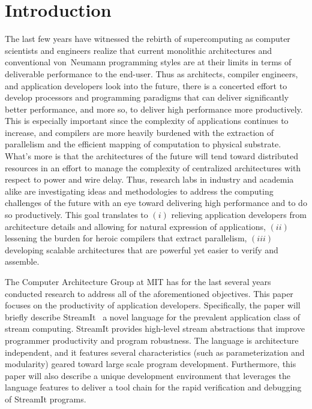 \documentclass[times, 10pt,twocolumn]{article}
\begin{document}
\section{Introduction}

The last  few years  have witnessed the  rebirth of  supercomputing as
computer  scientists  and engineers  realize  that current  monolithic
architectures and  conventional von~Neumann programming  styles are at
their  limits in  terms of  deliverable performance  to  the end-user.
Thus  as architects,  compiler engineers,  and  application developers
look  into  the  future,  there  is  a  concerted  effort  to  develop
processors  and programming paradigms  that can  deliver significantly
better  performance, and  more so,  to deliver  high  performance more
productively.  This  is especially  important since the  complexity of
applications  continues to  increase, and  compilers are  more heavily
burdened with the extraction  of parallelism and the efficient mapping
of  computation  to  physical  substrate.   What's more  is  that  the
architectures of the future  will tend toward distributed resources in
an effort  to manage the complexity of  centralized architectures with
respect to power  and wire delay. Thus, research  labs in industry and
academia alike  are investigating  ideas and methodologies  to address
the computing challenges  of the future with an  eye toward delivering
high performance  and to do  so productively. This goal  translates to
$(i)$ relieving application  developers from architecture details and
allowing for natural expression  of applications, $(ii)$ lessening the
burden  for   heroic  compilers  that   extract  parallelism,  $(iii)$
developing  scalable architectures  that  are powerful  yet easier  to
verify and assemble.

The Computer Architecture Group at  MIT has for the last several years
conducted  research to  address all  of the  aforementioned objectives.
This   paper    focuses   on   the    productivity   of   application
developers.   Specifically,   the    paper   will   briefly   describe
StreamIt~\cite{streamitcc}  a   novel  language  for   the  prevalent
application  class of stream  computing. StreamIt  provides high-level
stream abstractions  that improve programmer  productivity and program
robustness.  The language is architecture independent, and it features
several  characteristics  (such  as parameterization  and  modularity)
geared  toward  large scale  program  development.  Furthermore,  this
paper  will  also  describe  a  unique  development  environment  that
leverages the language  features to deliver a tool chain  for the rapid
verification and debugging of StreamIt programs.
\end{document}
